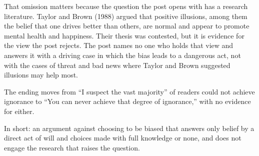 \begin{afterword}
That omission matters because the question the post opens with has a research literature. Taylor and Brown (1988) argued that positive illusions, among them the belief that one drives better than others, are normal and appear to promote mental health and happiness. Their thesis was contested, but it is evidence for the view the post rejects. The post names no one who holds that view and answers it with a driving case in which the bias leads to a dangerous act, not with the cases of threat and bad news where Taylor and Brown suggested illusions may help most.

The ending moves from ``I suspect the vast majority'' of readers could not achieve ignorance to ``You can never achieve that degree of ignorance,'' with no evidence for either.

In short: an argument against choosing to be biased that answers only belief by a direct act of will and choices made with full knowledge or none, and does not engage the research that raises the question.
\end{afterword}
